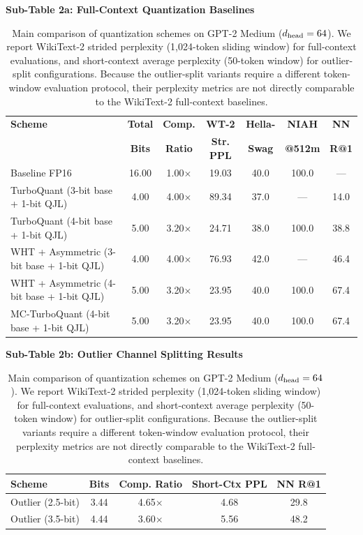 \begin{table}[ht]
\vspace{-4pt}
\centering
\caption{Main comparison of quantization schemes on GPT-2 Medium
($d_{\text{head}} = 64$). We report WikiText-2 strided perplexity (1{,}024-token sliding window) for full-context evaluations, and short-context average perplexity (50-token window) for outlier-split configurations. Because the outlier-split variants require a different token-window evaluation protocol, their perplexity metrics are not directly comparable to the WikiText-2 full-context baselines.}
\label{tab:main}

\medskip
\textbf{Sub-Table 2a: Full-Context Quantization Baselines} \\
\vspace{2pt}
\footnotesize
\begin{tabular}{@{}>{\raggedright\arraybackslash}p{4.5cm}cccccc@{}}
\toprule
\textbf{Scheme} & \textbf{Total} & \textbf{Comp.} & \textbf{WT-2} & \textbf{Hella-} & \textbf{NIAH} & \textbf{NN} \\
 & \textbf{Bits} & \textbf{Ratio} & \textbf{Str. PPL} & \textbf{Swag} & \textbf{@512m} & \textbf{R@1} \\
\midrule
Baseline FP16   & 16.00 & 1.00$\times$ & 19.03 & 40.0 & 100.0 & --- \\
TurboQuant (3-bit base + 1-bit QJL) & 4.00 & 4.00$\times$ & 89.34 & 37.0 & --- & 14.0 \\
TurboQuant (4-bit base + 1-bit QJL) & 5.00 & 3.20$\times$ & 24.71 & 38.0 & 100.0 & 38.8 \\
WHT + Asymmetric (3-bit base + 1-bit QJL) & 4.00 & 4.00$\times$ & 76.93 & 42.0 & --- & 46.4 \\
WHT + Asymmetric (4-bit base + 1-bit QJL) & 5.00 & 3.20$\times$ & 23.95 & 40.0 & 100.0 & 67.4 \\
MC-TurboQuant (4-bit base + 1-bit QJL)    & 5.00 & 3.20$\times$ & 23.95 & 40.0 & 100.0 & 67.4 \\
\bottomrule
\end{tabular}

\vspace{4pt}
\textbf{Sub-Table 2b: Outlier Channel Splitting Results} \\
\vspace{2pt}
\footnotesize
\begin{tabular}{@{}lcccc@{}}
\toprule
\textbf{Scheme} & \textbf{Bits} & \textbf{Comp. Ratio} & \textbf{Short-Ctx PPL} & \textbf{NN R@1} \\
\midrule
Outlier (2.5-bit) & 3.44 & 4.65$\times$ & 4.68 & 29.8 \\
Outlier (3.5-bit) & 4.44 & 3.60$\times$ & 5.56 & 48.2 \\
\bottomrule
\end{tabular}
\vspace{-4pt}
\end{table}

